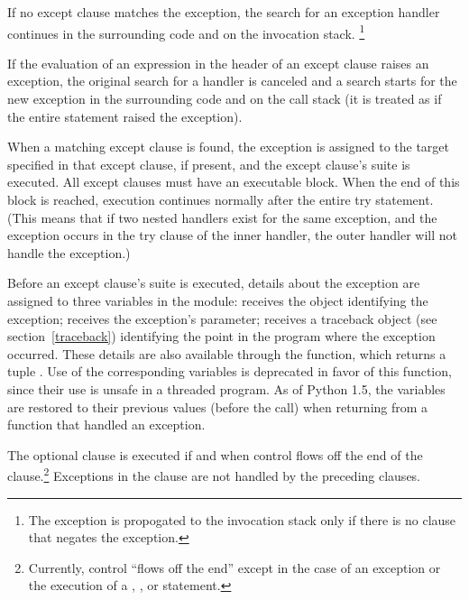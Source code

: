 If no except clause matches the exception, the search for an exception
handler continues in the surrounding code and on the invocation stack.
\footnote{The exception is propogated to the invocation stack only if
there is no  clause that negates the exception.}

If the evaluation of an expression in the header of an except clause
raises an exception, the original search for a handler is canceled
and a search starts for the new exception in the surrounding code and
on the call stack (it is treated as if the entire  statement
raised the exception).

When a matching except clause is found, the exception is assigned to
the target specified in that except clause, if present, and the except
clause's suite is executed.  All except clauses must have an
executable block.  When the end of this block is reached, execution
continues normally after the entire try statement.  (This means that
if two nested handlers exist for the same exception, and the exception
occurs in the try clause of the inner handler, the outer handler will
not handle the exception.)

Before an except clause's suite is executed, details about the
exception are assigned to three variables in the
 module:  receives
the object identifying the exception;  receives
the exception's parameter;  receives a
traceback object (see section~\ref{traceback})
identifying the point in the program where the exception occurred.
These details are also available through the 
function, which returns a tuple .  Use of the corresponding variables is
deprecated in favor of this function, since their use is unsafe in a
threaded program.  As of Python 1.5, the variables are restored to
their previous values (before the call) when returning from a function
that handled an exception.

The optional  clause is executed if and when control
flows off the end of the  clause.\footnote{
  Currently, control ``flows off the end'' except in the case of an
  exception or the execution of a ,
  , or  statement.
} Exceptions in the  clause are not handled by the
preceding  clauses.

